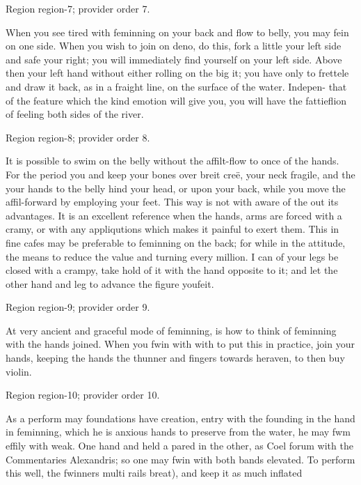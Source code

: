 \documentclass[11pt]{article}
\begin{document}
{\scriptsize\color{gray} Region region-7; provider order 7.\par}
\medskip

When you see tired with feminning on your back and flow to belly, you may fein on one side. When you wish to join on deno, do this, fork a little your left side and safe your right; you will immediately find yourself on your left side. Above then your left hand without either rolling on the big it; you have only to frettele and draw it back, as in a fraight line, on the surface of the water. Indepen- that of the feature which the kind emotion will give you, you will have the fattieflion of feeling both sides of the river.
\par

{\scriptsize\color{gray} Region region-8; provider order 8.\par}
\medskip

It is possible to swim on the belly without the affilt-flow to once of the hands. For the period you and keep your bones over breit creë, your neck fragile, and the your hands to the belly hind your head, or upon your back, while you move the affil-forward by employing your feet. This way is not with aware of the out its advantages. It is an excellent reference when the hands, arms are forced with a cramy, or with any appliqutions which makes it painful to exert them. This in fine cafes may be preferable to feminning on the back; for while in the attitude, the means to reduce the value and turning every million. I can of your legs be closed with a crampy, take hold of it with the hand opposite to it; and let the other hand and leg to advance the figure youfeit.
\par

{\scriptsize\color{gray} Region region-9; provider order 9.\par}
\medskip

At very ancient and graceful mode of feminning, is how to think of feminning with the hands joined. When you fwin with with to put this in practice, join your hands, keeping the hands the thunner and fingers towards heraven, to then buy violin.
\par

{\scriptsize\color{gray} Region region-10; provider order 10.\par}
\medskip

As a perform may foundations have creation, entry with the founding in the hand in feminning, which he is anxious hands to preserve from the water, he may fwm effily with weak. One hand and held a pared in the other, as Coel forum with the Commentaries Alexandris; so one may fwin with both bands elevated. To perform this well, the fwinners multi rails breat), and keep it as much inflated
\par
\end{document}

